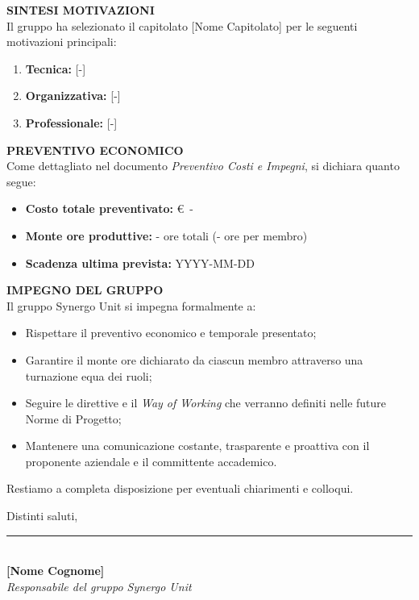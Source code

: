 \documentclass[11pt, a4paper]{article}
\begin{document}
	\vspace{0.5cm}
	\textbf{\textcolor{primarycolor}{SINTESI MOTIVAZIONI}} \\
	Il gruppo ha selezionato il capitolato {[Nome Capitolato]} per le seguenti motivazioni principali:
	\begin{enumerate}
		\item \textbf{Tecnica:} {[-]}
		\item \textbf{Organizzativa:} {[-]}
		\item \textbf{Professionale:} {[-]}
	\end{enumerate}
	
	\vspace{0.5cm}
	\textbf{\textcolor{primarycolor}{PREVENTIVO ECONOMICO}} \\
	Come dettagliato nel documento \textit{Preventivo Costi e Impegni}, si dichiara quanto segue:
	\begin{itemize}
		\item \textbf{Costo totale preventivato:} \euro\ -
		\item \textbf{Monte ore produttive:} - ore totali (- ore per membro)
		\item \textbf{Scadenza ultima prevista:} YYYY-MM-DD
	\end{itemize}
	
	\vspace{0.5cm}
	\textbf{\textcolor{primarycolor}{IMPEGNO DEL GRUPPO}} \\
	Il gruppo Synergo Unit si impegna formalmente a:
	\begin{itemize}
		\item Rispettare il preventivo economico e temporale presentato;
		\item Garantire il monte ore dichiarato da ciascun membro attraverso una turnazione equa dei ruoli;
		\item Seguire le direttive e il \textit{Way of Working} che verranno definiti nelle future Norme di Progetto;
		\item Mantenere una comunicazione costante, trasparente e proattiva con il proponente aziendale e il committente accademico.
	\end{itemize}
	
	\vspace{0.5cm}
	Restiamo a completa disposizione per eventuali chiarimenti e colloqui.
	
	\vspace{0.5cm}
	Distinti saluti,
	
	\vspace{1.5cm}
	\noindent
	\begin{minipage}[c]{0.5\textwidth}
		\begin{flushleft}
			\rule{6cm}{0.4pt} \\ 
			\vspace{0.1cm}
			\textbf{{[Nome Cognome]}} \\
			\textit{Responsabile del gruppo Synergo Unit}
		\end{flushleft}
	\end{minipage}
	
\end{document}
